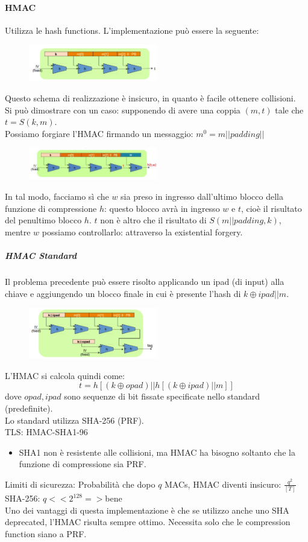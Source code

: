 \documentclass[a4paper,12pt]{article}
\begin{document}
\paragraph{HMAC}
Utilizza le hash functions. L'implementazione può essere la seguente:
\begin{figure}[H]
	\centering
	\includegraphics[width=0.5\textwidth]{img/hmac.png}
\end{figure}
Questo schema di realizzazione è insicuro, in quanto è facile ottenere collisioni. \\
Si può dimostrare con un caso: supponendo di avere una coppia $(m,t)$ tale che $t = S(k,m)$. \\
Possiamo forgiare l'HMAC firmando un messaggio: $m^0 = m||padding||$
\begin{figure}[H]
	\centering
	\includegraphics[width=0.5\textwidth]{img/hmac2.png}
\end{figure}
In tal modo, facciamo sì che $w$ sia preso in ingresso dall'ultimo blocco della funzione di compressione $h$: questo blocco avrà in ingresso $w$ e $t$, cioè il risultato del penultimo blocco $h$.
$t$ non è altro che il risultato di $S(m||padding,k)$, mentre $w$ possiamo controllarlo: attraverso la existential forgery.
\subparagraph{HMAC Standard} Il problema precedente può essere risolto applicando un ipad (di input) alla chiave e aggiungendo un blocco finale in cui è presente l'hash di $k \oplus ipad||m$.
\begin{figure}[H]
	\centering
	\includegraphics[width=0.5\textwidth]{img/hmac-standard.png}
\end{figure}
L'HMAC si calcola quindi come:
$$ t = h[(k \oplus opad) || h[(k \oplus ipad) || m]]$$
dove $opad, ipad$ sono sequenze di bit fissate specificate nello standard (predefinite). \\
Lo standard utilizza SHA-256 (PRF). \\
TLS: HMAC-SHA1-96
\begin{itemize}
	\item SHA1 non è resistente alle collisioni, ma HMAC ha bisogno soltanto che la funzione di compressione sia PRF.
\end{itemize}
Limiti di sicurezza: Probabilità che dopo $q$ MACs, HMAC diventi insicuro: $\frac{q^2}{[T]}$ \\
SHA-256: $q << 2^{128} =>$bene \\
Uno dei vantaggi di questa implementazione è che se utilizzo anche uno SHA deprecated, l'HMAC risulta sempre ottimo. Necessita solo che le compression function siano a PRF.
\end{document}
